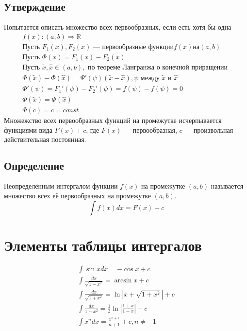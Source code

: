 \documentclass{article}
\begin{document}
\subsection{Утверждение}
Попытается описать множество всех первообразных, если есть хотя бы одна
\begin{gather*}
    f(x): (a, b) \Rightarrow \mathbb{R} \\
    \text{Пусть } F_1(x), F_2(x) \text{ --- первообразные функции} f(x) на (a, b) \\
    \text{Пусть } \Phi(x) = F_1(x) - F_2(x) \\
    \text{Пусть } \widetilde{x}, \widehat{x} \in (a, b), \text{ по теореме Лангранжа о конечной приращении } \\
    \Phi(\widetilde{x}) - \Phi(\widehat{x}) = 
    \Psi'(\psi)(\widetilde{x} - \widehat{x}), \psi \text{ между } \widetilde{x} \text{ и } \widehat{x} \\
    \Phi'(\psi) = F_1'(\psi) - F_2'(\psi) = f(\psi) - f(\psi) = 0 \\
    \Phi(\widetilde{x}) = \Phi(\widehat{x}) \\
    \Phi(c) = c = const
\end{gather*}
Множежство всех первообразных функций на промежутке исчерпывается функциями вида $F(x) + c$, 
где $F(x)$ --- первообразная, $c$ --- произвольная действительная постоянная.


\subsection{Определение}
Неопределённым интергалом функции $f(x)$ на промежутке $(a, b)$ называется множество всех её первообразных на промежутке $(a, b)$.
\[
    \int f(x) dx = F(x) + c
\]



\section{Элементы таблицы интергалов}
\begin{gather*}
    \int \sin x dx = -\cos x + c \\
    \int \frac{dx}{\sqrt{1 - x^2}} = \arcsin x + c \\
    \int \frac{dx}{\sqrt{1 + x^2}} = \ln \left| x + \sqrt{1 + x^2} \right| + c \\
    \int \frac{dx}{1 - x^2} = \frac{1}{2} \ln \left| \frac{1 + x}{1 - x} \right| + c \\
    \int x^n dx = \frac{x^{n + 1}}{n + 1} + c, n \neq -1
\end{gather*}
\end{document}
